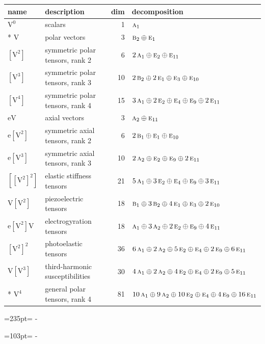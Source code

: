 \documentclass[10pt,a4paper]{article}
\newcommand{\needspace}[1]{\par\penalty-100\begingroup\dimen0=#1\relax\dimen2=\pagegoal
  \advance\dimen2-\pagetotal\ifdim\dimen0>\dimen2\relax\ifdim\dimen2>0pt\vfil\break\fi\fi
  \endgroup}
\numberwithin{equation}{section}
\newcommand{\irr}[1]{\text{\normalfont\scshape #1}}
\newcommand{\jahn}[1]{\mathrm{#1}}
\newlength{\fillwidth}\newlength{\cellwidth}\newlength{\colwidth}
\begin{document}
{\begin{longtable}{@{}llr>{\RaggedRight\arraybackslash}p{\fillwidth}@{}}
name & description & dim & decomposition\\\midrule\endhead
\bottomrule\endfoot\endlastfoot
$\jahn{V^{0}}$ & scalars & 1 & $\irr{a}_{1}$\\*
$\jahn{V}$ & polar vectors & 3 & $\irr{b}_{2} \oplus\allowbreak \irr{e}_{1}$\\
$\jahn{[V^{2}]}$ & symmetric polar tensors, rank 2 & 6 & $2\,\irr{a}_{1} \oplus\allowbreak \irr{e}_{2} \oplus\allowbreak \irr{e}_{11}$\\
$\jahn{[V^{3}]}$ & symmetric polar tensors, rank 3 & 10 & $2\,\irr{b}_{2} \oplus\allowbreak 2\,\irr{e}_{1} \oplus\allowbreak \irr{e}_{3} \oplus\allowbreak \irr{e}_{10}$\\
$\jahn{[V^{4}]}$ & symmetric polar tensors, rank 4 & 15 & $3\,\irr{a}_{1} \oplus\allowbreak 2\,\irr{e}_{2} \oplus\allowbreak \irr{e}_{4} \oplus\allowbreak \irr{e}_{9} \oplus\allowbreak 2\,\irr{e}_{11}$\\
$\jahn{eV}$ & axial vectors & 3 & $\irr{a}_{2} \oplus\allowbreak \irr{e}_{11}$\\
$\jahn{e[V^{2}]}$ & symmetric axial tensors, rank 2 & 6 & $2\,\irr{b}_{1} \oplus\allowbreak \irr{e}_{1} \oplus\allowbreak \irr{e}_{10}$\\
$\jahn{e[V^{3}]}$ & symmetric axial tensors, rank 3 & 10 & $2\,\irr{a}_{2} \oplus\allowbreak \irr{e}_{2} \oplus\allowbreak \irr{e}_{9} \oplus\allowbreak 2\,\irr{e}_{11}$\\
$\jahn{[[V^{2}]^{2}]}$ & elastic stiffness tensors & 21 & $5\,\irr{a}_{1} \oplus\allowbreak 3\,\irr{e}_{2} \oplus\allowbreak \irr{e}_{4} \oplus\allowbreak \irr{e}_{9} \oplus\allowbreak 3\,\irr{e}_{11}$\\
$\jahn{V[V^{2}]}$ & piezoelectric tensors & 18 & $\irr{b}_{1} \oplus\allowbreak 3\,\irr{b}_{2} \oplus\allowbreak 4\,\irr{e}_{1} \oplus\allowbreak \irr{e}_{3} \oplus\allowbreak 2\,\irr{e}_{10}$\\
$\jahn{e[V^{2}]V}$ & electrogyration tensors & 18 & $\irr{a}_{1} \oplus\allowbreak 3\,\irr{a}_{2} \oplus\allowbreak 2\,\irr{e}_{2} \oplus\allowbreak \irr{e}_{9} \oplus\allowbreak 4\,\irr{e}_{11}$\\
$\jahn{[V^{2}]^{2}}$ & photoelastic tensors & 36 & $6\,\irr{a}_{1} \oplus\allowbreak 2\,\irr{a}_{2} \oplus\allowbreak 5\,\irr{e}_{2} \oplus\allowbreak \irr{e}_{4} \oplus\allowbreak 2\,\irr{e}_{9} \oplus\allowbreak 6\,\irr{e}_{11}$\\
$\jahn{V[V^{3}]}$ & third-harmonic susceptibilities & 30 & $4\,\irr{a}_{1} \oplus\allowbreak 2\,\irr{a}_{2} \oplus\allowbreak 4\,\irr{e}_{2} \oplus\allowbreak \irr{e}_{4} \oplus\allowbreak 2\,\irr{e}_{9} \oplus\allowbreak 5\,\irr{e}_{11}$\\*
$\jahn{V^{4}}$ & general polar tensors, rank 4 & 81 & $10\,\irr{a}_{1} \oplus\allowbreak 9\,\irr{a}_{2} \oplus\allowbreak 10\,\irr{e}_{2} \oplus\allowbreak \irr{e}_{4} \oplus\allowbreak 4\,\irr{e}_{9} \oplus\allowbreak 16\,\irr{e}_{11}$\\
\bottomrule\end{longtable}}
\needspace{235pt}
\needspace{103pt}
\end{document}
